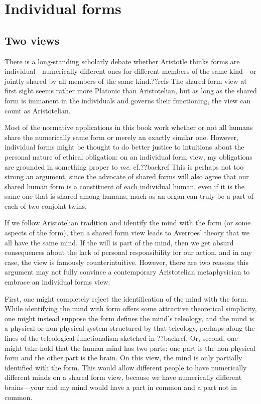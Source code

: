 \section{Individual forms}
\subsection{Two views}
There is a long-standing scholarly debate whether Aristotle thinks forms are individual---numerically different ones for different members of 
the same kind---or jointly shared by all members of the same kind.??refs The shared form view at first sight seems rather 
more Platonic than Aristotelian, but as long as the shared form is immanent in the individuals and governs their functioning,
the view can count as Aristotelian. 

Most of the normative applications in this book work whether or not all humans share the numerically same form or merely 
an exactly similar one. However, individual forms might be thought to do better justice to intuitions about the personal 
nature of ethical obligation: on an individual form view, my obligations are grounded in something proper to \textit{me}. cf.??backref This is perhaps not too strong an argument, since the advocate of shared forms will also agree that our 
shared human form is a constituent of each individual human, even if it is the same one that is shared among humans, much 
as an organ can truly be a part of each of two conjoint twins. 

If we follow Aristotelian tradition and identify the mind with the form (or some aspects of the form), then a shared form 
view leads to Averroes' theory that we all have the same mind. If the will is part of the mind, then we get absurd consequences
about the lack of personal responsibility for our action, and in any case, the view is famously counterintuitive. However, 
there are two reasons this argument may not fully convince a contemporary Aristotelian metaphysician to embrace an individual
forms view. 

First, one might completely reject the identification of the mind with the form. While identifying the mind with 
form offers some attractive theoretical simplicity, one might instead suppose the form defines the mind's teleology, and the mind is a physical or non-physical system 
structured by that teleology, perhaps along the lines of the teleological functionalism sketched in ??backref. Or, second,
one might take hold that the human mind has two parts: one part is the non-physical form and the other part is the brain.
On this view, the mind is only partially identified with the form. This would allow different people to have numerically different
minds on a shared form view, because we have numerically different brains---your and my mind would have a part in common
and a part not in common. 

